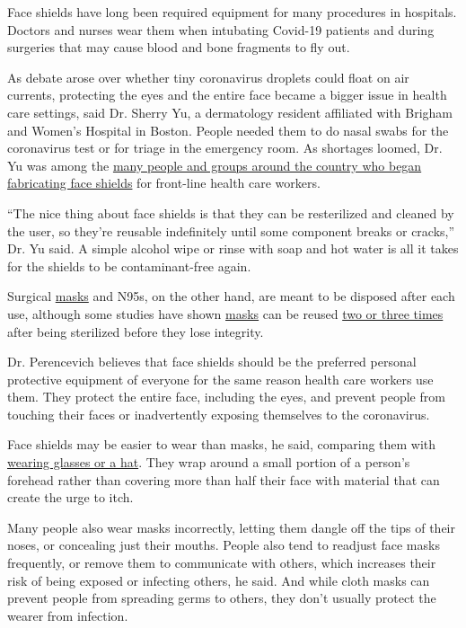 Face shields have long been required equipment for many procedures in
hospitals. Doctors and nurses wear them when intubating Covid-19
patients and during surgeries that may cause blood and bone fragments to
fly out.

As debate arose over whether tiny coronavirus droplets could float on
air currents, protecting the eyes and the entire face became a bigger
issue in health care settings, said Dr. Sherry Yu, a dermatology
resident affiliated with Brigham and Women's Hospital in Boston. People
needed them to do nasal swabs for the coronavirus test or for triage in
the emergency room. As shortages loomed, Dr. Yu was among the
\href{https://www.nytimes3xbfgragh.onion/2020/03/30/health/coronavirus-innovators.html}{many
people and groups around the country who began fabricating face shields}
for front-line health care workers.

``The nice thing about face shields is that they can be resterilized and
cleaned by the user, so they're reusable indefinitely until some
component breaks or cracks,'' Dr. Yu said. A simple alcohol wipe or
rinse with soap and hot water is all it takes for the shields to be
contaminant-free again.

Surgical
\href{https://www.nytimes3xbfgragh.onion/2020/06/12/health/coronavirus-cdc-masks-gatherings.html}{masks}
and N95s, on the other hand, are meant to be disposed after each use,
although some studies have shown
\href{https://www.nytimes3xbfgragh.onion/article/face-shield-mask-california-coronavirus.html}{masks}
can be reused
\href{https://www.nytimes3xbfgragh.onion/2020/04/16/health/n95-masks-decontaminated-coronavirus.html}{two
or three times} after being sterilized before they lose integrity.

Dr. Perencevich believes that face shields should be the preferred
personal protective equipment of everyone for the same reason health
care workers use them. They protect the entire face, including the eyes,
and prevent people from touching their faces or inadvertently exposing
themselves to the coronavirus.

Face shields may be easier to wear than masks, he said, comparing them
with
\href{https://twitter.com/eliowa/status/1261299983560716288}{wearing
glasses or a hat}. They wrap around a small portion of a person's
forehead rather than covering more than half their face with material
that can create the urge to itch.

Many people also wear masks incorrectly, letting them dangle off the
tips of their noses, or concealing just their mouths. People also tend
to readjust face masks frequently, or remove them to communicate with
others, which increases their risk of being exposed or infecting others,
he said. And while cloth masks can prevent people from spreading germs
to others, they don't usually protect the wearer from infection.


